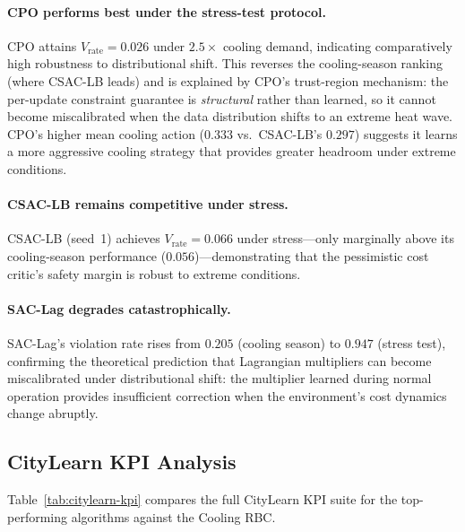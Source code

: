 \paragraph{CPO performs best under the stress-test protocol.}
CPO attains $V_{\text{rate}} = 0.026$ under $2.5\times$ cooling demand,
indicating comparatively high robustness to distributional shift.  This reverses
the cooling-season ranking (where CSAC-LB
leads) and is explained by CPO's trust-region mechanism: the per-update
constraint guarantee is \emph{structural} rather than learned, so it cannot
become miscalibrated when the data distribution shifts to an extreme heat wave.
CPO's higher mean cooling action ($0.333$ vs.\ CSAC-LB's $0.297$) suggests it
learns a more aggressive cooling strategy that provides greater headroom under
extreme conditions.

\paragraph{CSAC-LB remains competitive under stress.}
CSAC-LB (seed~1) achieves $V_{\text{rate}} = 0.066$ under stress---only
marginally above its cooling-season performance ($0.056$)---demonstrating that the
pessimistic cost critic's safety margin is robust to extreme conditions.

\paragraph{SAC-Lag degrades catastrophically.}
SAC-Lag's violation rate rises from $0.205$ (cooling season) to $0.947$ (stress
test), confirming the theoretical prediction that Lagrangian multipliers can
become miscalibrated under distributional shift: the multiplier learned during
normal operation provides insufficient correction when the environment's cost
dynamics change abruptly.


\subsection{CityLearn KPI Analysis}
\label{sec:temp-results-kpi}

Table~\ref{tab:citylearn-kpi} compares the full CityLearn KPI suite for the
top-performing algorithms against the Cooling RBC.

